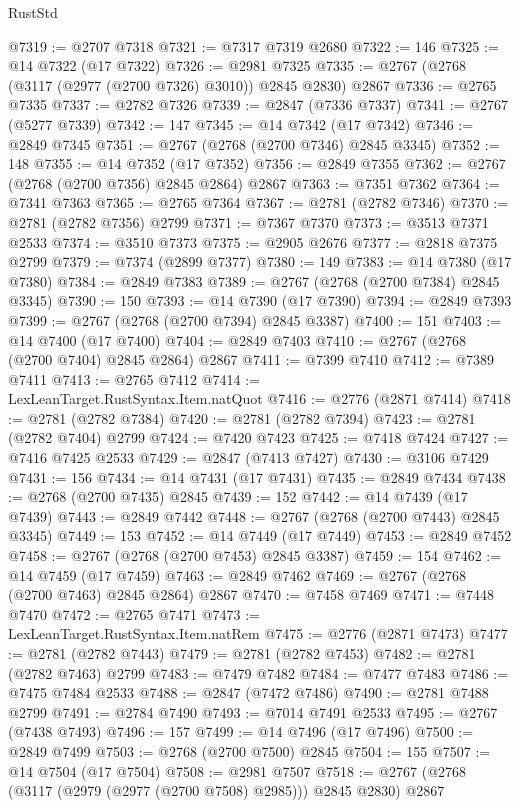 \begin{lexlean}{RustStd}
\begin{coremodule}
@7319 := @2707 @7318
@7321 := @7317 @7319 @2680
@7322 := 146
@7325 := @14 @7322 (@17 @7322)
@7326 := @2981 @7325
@7335 := @2767 (@2768 (@3117 (@2977 (@2700 @7326) @3010)) @2845 @2830) @2867
@7336 := @2765 @7335
@7337 := @2782 @7326
@7339 := @2847 (@7336 @7337)
@7341 := @2767 (@5277 @7339)
@7342 := 147
@7345 := @14 @7342 (@17 @7342)
@7346 := @2849 @7345
@7351 := @2767 (@2768 (@2700 @7346) @2845 @3345)
@7352 := 148
@7355 := @14 @7352 (@17 @7352)
@7356 := @2849 @7355
@7362 := @2767 (@2768 (@2700 @7356) @2845 @2864) @2867
@7363 := @7351 @7362
@7364 := @7341 @7363
@7365 := @2765 @7364
@7367 := @2781 (@2782 @7346)
@7370 := @2781 (@2782 @7356) @2799
@7371 := @7367 @7370
@7373 := @3513 @7371 @2533
@7374 := @3510 @7373
@7375 := @2905 @2676
@7377 := @2818 @7375 @2799
@7379 := @7374 (@2899 @7377)
@7380 := 149
@7383 := @14 @7380 (@17 @7380)
@7384 := @2849 @7383
@7389 := @2767 (@2768 (@2700 @7384) @2845 @3345)
@7390 := 150
@7393 := @14 @7390 (@17 @7390)
@7394 := @2849 @7393
@7399 := @2767 (@2768 (@2700 @7394) @2845 @3387)
@7400 := 151
@7403 := @14 @7400 (@17 @7400)
@7404 := @2849 @7403
@7410 := @2767 (@2768 (@2700 @7404) @2845 @2864) @2867
@7411 := @7399 @7410
@7412 := @7389 @7411
@7413 := @2765 @7412
@7414 := LexLeanTarget.RustSyntax.Item.natQuot
@7416 := @2776 (@2871 @7414)
@7418 := @2781 (@2782 @7384)
@7420 := @2781 (@2782 @7394)
@7423 := @2781 (@2782 @7404) @2799
@7424 := @7420 @7423
@7425 := @7418 @7424
@7427 := @7416 @7425 @2533
@7429 := @2847 (@7413 @7427)
@7430 := @3106 @7429
@7431 := 156
@7434 := @14 @7431 (@17 @7431)
@7435 := @2849 @7434
@7438 := @2768 (@2700 @7435) @2845
@7439 := 152
@7442 := @14 @7439 (@17 @7439)
@7443 := @2849 @7442
@7448 := @2767 (@2768 (@2700 @7443) @2845 @3345)
@7449 := 153
@7452 := @14 @7449 (@17 @7449)
@7453 := @2849 @7452
@7458 := @2767 (@2768 (@2700 @7453) @2845 @3387)
@7459 := 154
@7462 := @14 @7459 (@17 @7459)
@7463 := @2849 @7462
@7469 := @2767 (@2768 (@2700 @7463) @2845 @2864) @2867
@7470 := @7458 @7469
@7471 := @7448 @7470
@7472 := @2765 @7471
@7473 := LexLeanTarget.RustSyntax.Item.natRem
@7475 := @2776 (@2871 @7473)
@7477 := @2781 (@2782 @7443)
@7479 := @2781 (@2782 @7453)
@7482 := @2781 (@2782 @7463) @2799
@7483 := @7479 @7482
@7484 := @7477 @7483
@7486 := @7475 @7484 @2533
@7488 := @2847 (@7472 @7486)
@7490 := @2781 @7488 @2799
@7491 := @2784 @7490
@7493 := @7014 @7491 @2533
@7495 := @2767 (@7438 @7493)
@7496 := 157
@7499 := @14 @7496 (@17 @7496)
@7500 := @2849 @7499
@7503 := @2768 (@2700 @7500) @2845
@7504 := 155
@7507 := @14 @7504 (@17 @7504)
@7508 := @2981 @7507
@7518 := @2767 (@2768 (@3117 (@2979 (@2977 (@2700 @7508) @2985))) @2845 @2830) @2867

\end{coremodule}
\end{lexlean}
